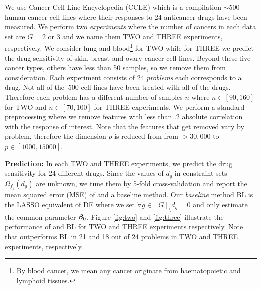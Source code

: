 We use Cancer Cell Line Encyclopedia (CCLE) \cite{barretina2012cancer} which is a compilation $\sim$500 human cancer cell lines where their responses to 24 anticancer drugs have been measured.%
We perform two \emph{experiments} where the number of cancers in each data set are $G =2$ or $3$ and we name them TWO and THREE experiments, respectively. 
We consider lung and blood\footnote{By blood cancer, we mean any cancer originate from haematopoietic and lymphoid tissues.} for TWO while for THREE we predict the drug sensitivity of skin, breast and ovary cancer cell lines. 
Beyond these five cancer types, others have less than 50 samples, so we remove them from consideration.
Each experiment consists of 24 \emph{problems} each corresponds to a drug. %
Not all of the $~$500 cell lines have been treated with all of the drugs. 
Therefore each problem has a different number of samples $n$ where $n \in [90, 160]$ for TWO and $n \in [70, 100]$ for THREE experiments.
We perform a standard preprocessing \cite{barretina2012cancer} where we remove features with less than $.2$ absolute correlation with the response of interest.%
Note that the features that get removed vary by problem, therefore the dimension $p$ is reduced from from $>30,000$ to $p \in [1000, 15000]$. 

{\bf Prediction:} In each TWO and THREE experiments, we predict the drug sensitivity for 24 different drugs.  %
Since the values of $d_g$  in constraint sets $\Omega_{f_g}(d_g)$  are unknown, we tune them by 5-fold cross-validation and report the mean squared error (MSE) of \dc{} and a baseline method. 
Our \emph{baseline} method BL is the LASSO \cite{tibs96} equivalent of DE where we set $\forall g \in [G]_\setminus d_g = 0$ and only estimate the common parameter $\boldsymbol{\beta}_0$. 
Figure \ref{fig:two} and \ref{fig:three} illustrate the performance of \dc{} and BL for TWO and THREE experiments respectively. 
Note that \dc{} outperforms BL in 21 and 18 out of 24 problems in TWO and THREE experiments, respectively.

